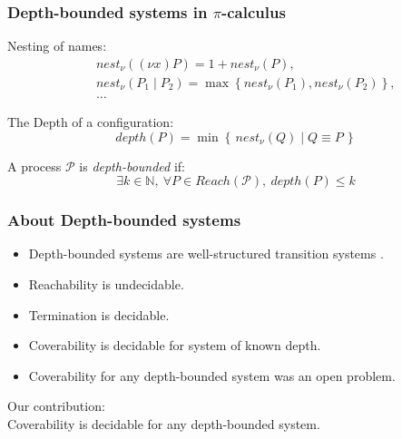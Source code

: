\documentclass{beamer}
\newcommand{\pical}{$\pi$-calculus}
\newcommand{\nest}{\mathit{nest}_\nu}
\newcommand{\depth}{\mathit{depth}}
\newcommand{\set}[1]{\left\{#1\right\}}
\newcommand{\pset}[2]{\set{\,#1\mid#2\,}}
\newcommand{\process}{\mathcal{P}}
\newcommand{\Reach}{\mathit{Reach}}
\begin{document}
\begin{frame}
  \frametitle{Depth-bounded systems in \pical{}}
  Nesting of names:
  \begin{eqnarray*}
  & & \nest((\nu x)P) = 1 + \nest(P),\\
  & & \nest(P_1 \mid P_2) = \max\set{\nest(P_1),\nest(P_2)},\\
  & & \ldots
  \end{eqnarray*}

  The Depth of a configuration:
  \[\depth(P) = \min\pset{\nest(Q)}{Q \equiv P}\]

  A process $\process$ is \emph{depth-bounded} if:
  \[\exists k \in \mathbb{N}, ~ \forall P \in \Reach(\process), ~ \depth(P) \leq k\]
\end{frame}

\begin{frame}
  \frametitle{About Depth-bounded systems}
  \begin{itemize}
  \item Depth-bounded systems are well-structured transition systems \cite{Meyer08OnBoundednessInDepth}.
  \item Reachability is undecidable.
  \item Termination is decidable.
  \item Coverability is decidable for system of known depth.
  \item Coverability for any depth-bounded system was an open problem.
  \end{itemize}

  \vspace{10pt}

  Our contribution:\\
  Coverability is decidable for any depth-bounded system.

\end{frame}
\end{document}
